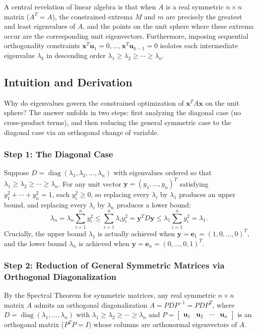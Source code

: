\documentclass[11pt, letterpaper]{article}
\theoremstyle{definition}
\theoremstyle{remark}
\begin{document}
A central revelation of linear algebra is that when $A$ is a real symmetric $n \times n$ matrix ($A^T = A$), the constrained extrema $M$ and $m$ are precisely the greatest and least eigenvalues of $A$, and the points on the unit sphere where these extrema occur are the corresponding unit eigenvectors. Furthermore, imposing sequential orthogonality constraints $\mathbf{x}^T \mathbf{u}_1 = 0, \dots, \mathbf{x}^T \mathbf{u}_{k-1} = 0$ isolates each intermediate eigenvalue $\lambda_k$ in descending order $\lambda_1 \ge \lambda_2 \ge \cdots \ge \lambda_n$.

\subsection{Intuition and Derivation}
Why do eigenvalues govern the constrained optimization of $\mathbf{x}^T A \mathbf{x}$ on the unit sphere? The answer unfolds in two steps: first analyzing the diagonal case (no cross-product terms), and then reducing the general symmetric case to the diagonal case via an orthogonal change of variable.

\subsubsection*{Step 1: The Diagonal Case}
Suppose $D = \operatorname{diag}(\lambda_1, \lambda_2, \dots, \lambda_n)$ with eigenvalues ordered so that $\lambda_1 \ge \lambda_2 \ge \cdots \ge \lambda_n$. For any unit vector $\mathbf{y} = (y_1, \dots, y_n)^T$ satisfying $y_1^2 + \cdots + y_n^2 = 1$, each $y_i^2 \ge 0$, so replacing every $\lambda_i$ by $\lambda_1$ produces an upper bound, and replacing every $\lambda_i$ by $\lambda_n$ produces a lower bound:
\[
\lambda_n = \lambda_n \sum_{i=1}^n y_i^2 \le \sum_{i=1}^n \lambda_i y_i^2 = \mathbf{y}^T D \mathbf{y} \le \lambda_1 \sum_{i=1}^n y_i^2 = \lambda_1.
\]
Crucially, the upper bound $\lambda_1$ is actually achieved when $\mathbf{y} = \mathbf{e}_1 = (1, 0, \dots, 0)^T$, and the lower bound $\lambda_n$ is achieved when $\mathbf{y} = \mathbf{e}_n = (0, \dots, 0, 1)^T$.

\subsubsection*{Step 2: Reduction of General Symmetric Matrices via Orthogonal Diagonalization}
By the Spectral Theorem for symmetric matrices, any real symmetric $n \times n$ matrix $A$ admits an orthogonal diagonalization $A = P D P^{-1} = P D P^T$, where $D = \operatorname{diag}(\lambda_1, \dots, \lambda_n)$ with $\lambda_1 \ge \lambda_2 \ge \cdots \ge \lambda_n$ and $P = \begin{bmatrix} \mathbf{u}_1 & \mathbf{u}_2 & \cdots & \mathbf{u}_n \end{bmatrix}$ is an orthogonal matrix ($P^T P = I$) whose columns are orthonormal eigenvectors of $A$.
\end{document}
